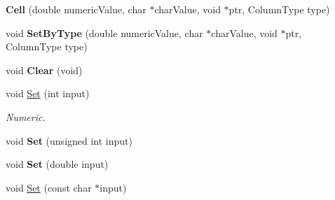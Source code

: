 \begin{DoxyCompactItemize}
\item 
\hypertarget{struct_data_structures_1_1_table_1_1_cell_ae71d02ea3e7179bc01903606f5bf3c9f}{{\bfseries Cell} (double numeric\-Value, char $\ast$char\-Value, void $\ast$ptr, Column\-Type type)}\label{struct_data_structures_1_1_table_1_1_cell_ae71d02ea3e7179bc01903606f5bf3c9f}

\item 
\hypertarget{struct_data_structures_1_1_table_1_1_cell_af8f8c65cd85b07ed1c374ff4ed5a3008}{void {\bfseries Set\-By\-Type} (double numeric\-Value, char $\ast$char\-Value, void $\ast$ptr, Column\-Type type)}\label{struct_data_structures_1_1_table_1_1_cell_af8f8c65cd85b07ed1c374ff4ed5a3008}

\item 
\hypertarget{struct_data_structures_1_1_table_1_1_cell_af8d74d1760885be42471fdd167978137}{void {\bfseries Clear} (void)}\label{struct_data_structures_1_1_table_1_1_cell_af8d74d1760885be42471fdd167978137}

\item 
\hypertarget{struct_data_structures_1_1_table_1_1_cell_af9025af5d98187d83c14c542755a87ac}{void \hyperlink{struct_data_structures_1_1_table_1_1_cell_af9025af5d98187d83c14c542755a87ac}{Set} (int input)}\label{struct_data_structures_1_1_table_1_1_cell_af9025af5d98187d83c14c542755a87ac}

\begin{DoxyCompactList}\small\item\em Numeric. \end{DoxyCompactList}\item 
\hypertarget{struct_data_structures_1_1_table_1_1_cell_a89d830be6b1614e2a695fcecf975e8e8}{void {\bfseries Set} (unsigned int input)}\label{struct_data_structures_1_1_table_1_1_cell_a89d830be6b1614e2a695fcecf975e8e8}

\item 
\hypertarget{struct_data_structures_1_1_table_1_1_cell_a92c624e2e917eb57cb6c1563236e0e01}{void {\bfseries Set} (double input)}\label{struct_data_structures_1_1_table_1_1_cell_a92c624e2e917eb57cb6c1563236e0e01}

\item 
\hypertarget{struct_data_structures_1_1_table_1_1_cell_a2d4a2327992e26d2074591d4dc6c988e}{void \hyperlink{struct_data_structures_1_1_table_1_1_cell_a2d4a2327992e26d2074591d4dc6c988e}{Set} (const char $\ast$input)}\label{struct_data_structures_1_1_table_1_1_cell_a2d4a2327992e26d2074591d4dc6c988e}


\end{DoxyCompactItemize}

